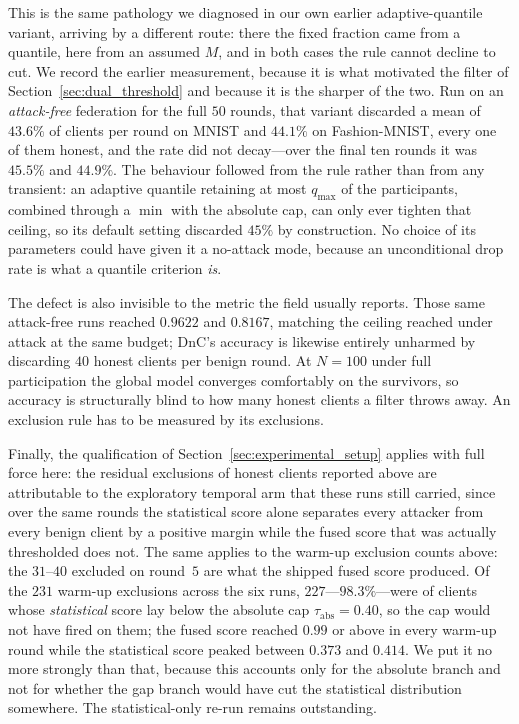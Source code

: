 \documentclass[journal]{IEEEtran}
\begin{document}
This is the same pathology we diagnosed in our own earlier adaptive-quantile variant, arriving by a different route: there the fixed fraction came from a quantile, here from an assumed $M$, and in both cases the rule cannot decline to cut. We record the earlier measurement, because it is what motivated the filter of Section~\ref{sec:dual_threshold} and because it is the sharper of the two. Run on an \emph{attack-free} federation for the full $50$ rounds, that variant discarded a mean of $43.6\%$ of clients per round on MNIST and $44.1\%$ on Fashion-MNIST, every one of them honest, and the rate did not decay---over the final ten rounds it was $45.5\%$ and $44.9\%$. The behaviour followed from the rule rather than from any transient: an adaptive quantile retaining at most $q_{\max}$ of the participants, combined through a $\min$ with the absolute cap, can only ever tighten that ceiling, so its default setting discarded $45\%$ by construction. No choice of its parameters could have given it a no-attack mode, because an unconditional drop rate is what a quantile criterion \emph{is}.

The defect is also invisible to the metric the field usually reports. Those same attack-free runs reached $0.9622$ and $0.8167$, matching the ceiling reached under attack at the same budget; DnC's accuracy is likewise entirely unharmed by discarding $40$ honest clients per benign round. At $N = 100$ under full participation the global model converges comfortably on the survivors, so accuracy is structurally blind to how many honest clients a filter throws away. An exclusion rule has to be measured by its exclusions.

Finally, the qualification of Section~\ref{sec:experimental_setup} applies with full force here: the residual exclusions of honest clients reported above are attributable to the exploratory temporal arm that these runs still carried, since over the same rounds the statistical score alone separates every attacker from every benign client by a positive margin while the fused score that was actually thresholded does not. The same applies to the warm-up exclusion counts above: the $31$--$40$ excluded on round~$5$ are what the shipped fused score produced. Of the $231$ warm-up exclusions across the six runs, $227$---$98.3\%$---were of clients whose \emph{statistical} score lay below the absolute cap $\tau_{\mathrm{abs}} = 0.40$, so the cap would not have fired on them; the fused score reached $0.99$ or above in every warm-up round while the statistical score peaked between $0.373$ and $0.414$. We put it no more strongly than that, because this accounts only for the absolute branch and not for whether the gap branch would have cut the statistical distribution somewhere. The statistical-only re-run remains outstanding.
\end{document}
